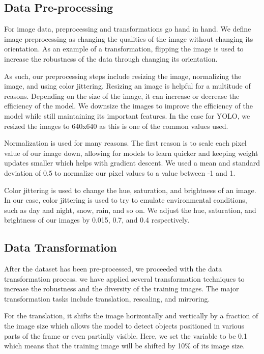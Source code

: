 \documentclass[stu,12pt,floatsintext]{apa7}
\begin{document}
\subsection{Data Pre-processing}
For image data, preprocessing and transformations go hand in hand. We define image preprocessing as changing the qualities of the image without changing its orientation. As an example of a transformation, flipping the image is used to increase the robustness of the data through changing its orientation.

As such, our preprocessing steps include resizing the image, normalizing the image, and using color jittering. Resizing an image is helpful for a multitude of reasons. Depending on the size of the image, it can increase or decrease the efficiency of the model. We downsize the images to improve the efficiency of the model while still maintaining its important features. In the case for YOLO, we resized the images to 640x640 as this is one of the common values used.

Normalization is used for many reasons. The first reason is to scale each pixel value of our image down, allowing for models to learn quicker and keeping weight updates smaller which helps with gradient descent. We used a mean and standard deviation of 0.5 to normalize our pixel values to a value between -1 and 1.

Color jittering is used to change the hue, saturation, and brightness of an image. In our case, color jittering is used to try to emulate environmental conditions, such as day and night, snow, rain, and so on. We adjust the hue, saturation, and brightness of our images by 0.015, 0.7, and 0.4 respectively.



\subsection{Data Transformation}
After the dataset has been pre-processed, we proceeded with the data transformation process. we have applied several transformation techniques to increase the robustness and the diversity of the training images. The major transformation tasks include translation, rescaling, and mirroring.

For the translation, it shifts the image horizontally and vertically by a fraction of the image size which allows the model to detect objects positioned in various parts of the frame or even partially visible. Here, we set the variable to be 0.1 which means that the training image will be shifted by 10\% of its image size.
\end{document}
